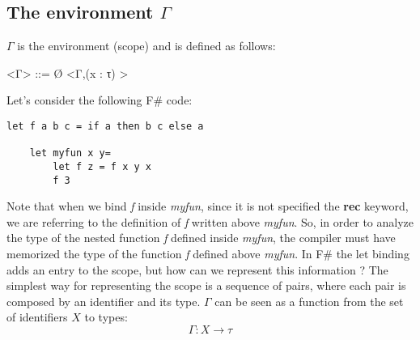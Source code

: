 \subsection{The environment $\Gamma$}
$\Gamma$ is the environment (scope) and is defined as follows:
\begin{grammar}
    <Γ> ::= Ø
    \alt <Γ,(x : τ) >
\end{grammar}
Let's consider the following F\# code:
\begin{lstlisting}[style=FSharpStyle]
    let f a b c = if a then b c else a

    let myfun x y=
        let f z = f x y x
        f 3
\end{lstlisting}
Note that when we bind \textit{f} inside \textit{myfun}, since it is not specified the \textbf{rec} keyword, we are referring to the definition of \textit{f} written above \textit{myfun}. So, in order to analyze the type of the nested function \textit{f} defined inside \textit{myfun}, the compiler must have memorized the type of the function \textit{f} defined above \textit{myfun}. In F\# the let binding adds an entry to the scope, but how can we represent this information ? \newline\newline
The simplest way for representing the scope is a sequence of pairs, where each pair is composed by an identifier and its type. $\Gamma$ can be seen as a function from the set of identifiers $X$ to types:
\[\Gamma: X \rightarrow \tau\]
